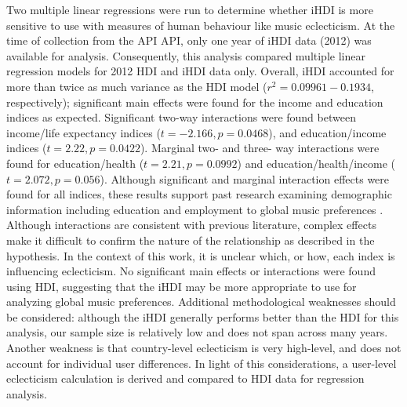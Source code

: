 \documentclass[a4paper]{article}
\begin{document}
Two multiple linear regressions were run to determine whether \Gls{iHDI} is more sensitive to use with measures of human behaviour like music eclecticism. At the time of collection from the \Gls{API} \Gls{API}, only one year of iHDI data (2012) was available for analysis. Consequently, this analysis compared multiple linear regression models for 2012 \Gls{HDI} and iHDI data only. Overall, iHDI accounted for more than twice as much variance as the \Gls{HDI} model ($r^2=0.09961-0.1934$, respectively); significant main effects were found for the income and education indices as expected. Significant two-way interactions were found between income/life expectancy indices ($t=-2.166, p = 0.0468$), and education/income indices ($t=2.22,p=0.0422$). Marginal two- and three- way interactions were found for education/health ($t=2.21, p=0.0992$) and education/health/income ($t=2.072,p=0.056$). Although significant and marginal interaction effects were found for all indices, these results support past research examining demographic information including education and employment to global music preferences \cite{leblanc1999effect,north2013musical}. Although interactions are consistent with previous literature, complex effects make it difficult to confirm the nature of the relationship as described in the hypothesis. In the context of this work, it is unclear which, or how, each index is influencing eclecticism.  No significant main effects or interactions were found using \Gls{HDI}, suggesting that the \Gls{iHDI} may be more appropriate to use for analyzing global music preferences. Additional methodological weaknesses should be considered: although the \Gls{iHDI} generally performs better than the \Gls{HDI} for this analysis, our sample size is relatively low and does not span across many years. Another weakness is that country-level eclecticism is very high-level, and does not account for individual user differences. In light of this considerations, a user-level eclecticism calculation is derived and compared to \Gls{HDI} data for regression analysis.
\end{document}
